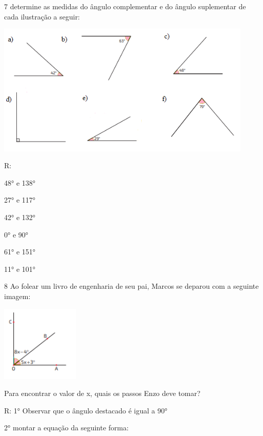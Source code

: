 {

\num{7} determine as medidas do ângulo complementar e do ângulo suplementar
de cada ilustração a seguir:

\includegraphics[width=4.81667in,height=2.48373in]{./imgSAEB_8_MAT/media/image30.png}

R:
\item 48° e 138°
\item 27° e 117°
\item 42° e 132°
\item 0° e 90°
\item 61° e 151°
\item 11° e 101°

\num{8} Ao folear um livro de engenharia de seu pai, Marcos se deparou com a
seguinte imagem:

\includegraphics[width=1.47134in,height=1.42708in]{./imgSAEB_8_MAT/media/image31.png}

Para encontrar o valor de x, quais os passos Enzo deve tomar?

R: 1° Observar que o ângulo destacado é igual a 90°

2° montar a equação da seguinte forma:

}
